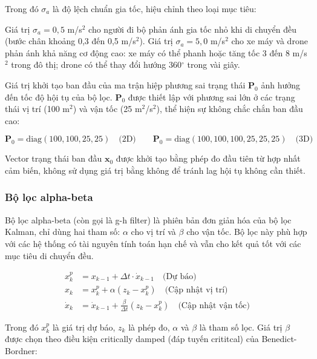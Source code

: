 Trong đó $\sigma_a$ là độ lệch chuẩn gia tốc, hiệu chỉnh theo loại mục tiêu:


Giá trị $\sigma_a = 0{,}5$ m/s$^2$ cho người đi bộ phản ánh gia tốc nhỏ khi di chuyển đều (bước chân khoảng 0,3 đến 0,5 m/s$^2$). Giá trị $\sigma_a = 5{,}0$ m/s$^2$ cho xe máy và drone phản ánh khả năng cơ động cao: xe máy có thể phanh hoặc tăng tốc 3 đến 8 m/s$^2$ trong đô thị; drone có thể thay đổi hướng 360$^\circ$ trong vài giây.

Giá trị khởi tạo ban đầu của ma trận hiệp phương sai trạng thái $\mathbf{P}_0$ ảnh hưởng đến tốc độ hội tụ của bộ lọc. $\mathbf{P}_0$ được thiết lập với phương sai lớn ở các trạng thái vị trí (100 m$^2$) và vận tốc (25 m$^2$/s$^2$), thể hiện sự không chắc chắn ban đầu cao:

\begin{equation}
\mathbf{P}_0 = \text{diag}(100, 100, 25, 25) \quad \text{(2D)} \qquad \mathbf{P}_0 = \text{diag}(100, 100, 100, 25, 25, 25) \quad \text{(3D)}
\end{equation}

Vector trạng thái ban đầu $\mathbf{x}_0$ được khởi tạo bằng phép đo đầu tiên từ hợp nhất cảm biến, không sử dụng giá trị bằng không để tránh lag hội tụ không cần thiết.

\subsubsection{Bộ lọc alpha-beta}

\hspace{0.5cm} Bộ lọc alpha-beta (còn gọi là g-h filter) là phiên bản đơn giản hóa của bộ lọc Kalman, chỉ dùng hai tham số: $\alpha$ cho vị trí và $\beta$ cho vận tốc. Bộ lọc này phù hợp với các hệ thống có tài nguyên tính toán hạn chế và vẫn cho kết quả tốt với các mục tiêu di chuyển đều.

\begin{equation}
\begin{aligned}
x_{k}^{p} &= x_{k-1} + \Delta t \cdot \dot{x}_{k-1} \quad \text{(Dự báo)} \\
x_{k} &= x_{k}^{p} + \alpha (z_{k} - x_{k}^{p}) \quad \text{(Cập nhật vị trí)} \\
\dot{x}_{k} &= \dot{x}_{k-1} + \frac{\beta}{\Delta t} (z_{k} - x_{k}^{p}) \quad \text{(Cập nhật vận tốc)}
\end{aligned}
\end{equation}

Trong đó $x_k^p$ là giá trị dự báo, $z_k$ là phép đo, $\alpha$ và $\beta$ là tham số lọc. Giá trị $\beta$ được chọn theo điều kiện critically damped (đáp tuyến crititcal) của Benedict-Bordner:

